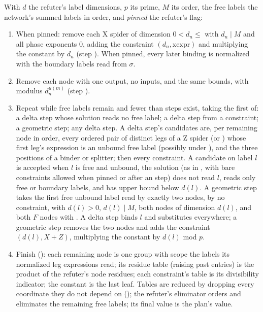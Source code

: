 {{{\begin{algorithm}\label{alg:lean-export-sym-plan}
With $d$ the refuter's label dimensions, $p$ its prime, $M$ its order, the free labels the network's summed labels in order, and \emph{pinned} the refuter's  flag:
\begin{enumerate}
\item When pinned: remove each X spider of dimension $0<d_n\le$  with $d_n\mid M$ and all phase exponents $0$, adding the constraint $(d_n,\mathrm{xexpr})$ and multiplying the constant by $d_n$ (step ). When pinned, every later binding is normalized with the boundary labels read from $\sigma$.
\item Remove each  node with one output, no inputs, and the same bounds, with modulus $d_n^{\mu(m)}$ (step ).
\item Repeat while free labels remain and fewer than  steps exist, taking the first of: a delta step whose solution reads no free label; a delta step from a constraint; a geometric step; any delta step. A delta step's candidates are, per remaining node in order, every ordered pair of distinct legs of a Z spider (or ) whose first leg's expression is an unbound free label (possibly under ), and the three positions of a binder or splitter; then every constraint. A candidate on label $l$ is accepted when $l$ is free and unbound, the solution (as in , with bare constraints allowed when pinned or after an  step) does not read $l$, reads only free or boundary labels, and has upper bound below $d(l)$. A geometric step takes the first free unbound label read by exactly two nodes, by no constraint, with $d(l)>0$, $d(l)\mid M$, both nodes of dimension $d(l)$, and both $F$ nodes with . A delta step binds $l$ and substitutes everywhere; a geometric step removes the two nodes and adds the constraint $(d(l),X+Z)$, multiplying the constant by $d(l)$ mod $p$.
\item Finish (): each remaining node is one group with scope the labels its normalized leg expressions read; its residue table (raising  past  entries) is the product of the refuter's node residues; each constraint's table is its divisibility indicator; the constant is the last leaf. Tables are reduced by dropping every coordinate they do not depend on (); the refuter's eliminator orders and eliminates the remaining free labels; its final value is the plan's value.
\end{enumerate}
\end{algorithm}

}}}
